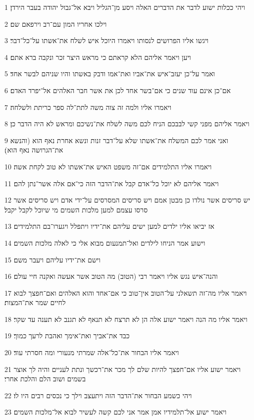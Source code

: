 \par 1 ויהי ככלות ישוע לדבר את הדברים האלה ויסע מן־הגליל ויבא אל־גבול יהודה בעבר הירדן׃
\par 2 וילכו אחריו המון עם־רב וירפאם שם׃
\par 3 ויגשו אליו הפרושים לנסותו ויאמרו היוכל איש לשלח את־אשתו על־כל־דבר׃
\par 4 ויען ויאמר אליהם הלא קראתם כי מראש היצר זכר ונקבה ברא אתם׃
\par 5 ואמר על־כן יעזב־איש את־אביו ואת־אמו ודבק באשתו והיו שניהם לבשר אחד׃
\par 6 אם־כן אינם עוד שנים כי אם־בשר אחד לכן את אשר חבר האלהים אל־יפרד האדם׃
\par 7 ויאמרו אליו ולמה זה צוה משה לתת־לה ספר כריתת ולשלחה׃
\par 8 ויאמר אליהם מפני קשי לבבכם הניח לכם משה לשלח את־נשיכם ומראש לא היה הדבר כן׃
\par 9 ואני אמר לכם המשלח את־אשתו שלא על־דבר זנות ונשא אחרת נאף הוא (והנשא את־הגרושה נאף הוא)׃
\par 10 ויאמרו אליו התלמידים אם־זה משפט האיש את־אשתו לא טוב לקחת אשה׃
\par 11 ויאמר אליהם לא יוכל כל־אדם קבל את־הדבר הזה כי־אם אלה אשר־נתן להם׃
\par 12 יש סריסים אשר נולדו כן מבטן אמם ויש סריסים המסרסים על־ידי אדם ויש סריסים אשר סרסו עצמם למען מלכות השמים מי שיוכל לקבל יקבל׃
\par 13 אז יביאו אליו ילדים למען ישים עליהם את־ידיו ויתפלל ויגערו־בם התלמידים׃
\par 14 וישוע אמר הניחו לילדים ואל־תמנעום מבוא אלי כי לאלה מלכות השמים׃
\par 15 וישם את־ידיו עליהם ויעבר משם׃
\par 16 והנה־איש נגש אליו ויאמר רבי (הטוב) מה הטוב אשר אעשה ואקנה חיי עולם׃
\par 17 ויאמר אליו מה־זה תשאלני על־הטוב אין־טוב כי אם־אחד והוא האלהים ואם־חפצך לבוא לחיים שמר את־המצות׃
\par 18 ויאמר אליו מה הנה ויאמר ישוע אלה הן לא תרצח לא תנאף לא תגנב לא תענה עד שקר׃
\par 19 כבד את־אביך ואת־אימך ואהבת לרעך כמוך׃
\par 20 ויאמר אליו הבחור את־כל־אלה שמרתי מנעורי ומה חסרתי עוד׃
\par 21 ויאמר ישוע אליו אם־חפצך להיות שלם לך מכר את־רכשך ונתת לעניים והיה לך אוצר בשמים ושוב הלם והלכת אחרי׃
\par 22 ויהי כשמע הבחור את־הדבר הזה ויתעצב וילך כי נכסים רבים היו לו׃
\par 23 ויאמר ישוע אל־תלמידיו אמן אמר אני לכם קשה לעשיר לבוא אל־מלכות השמים׃
